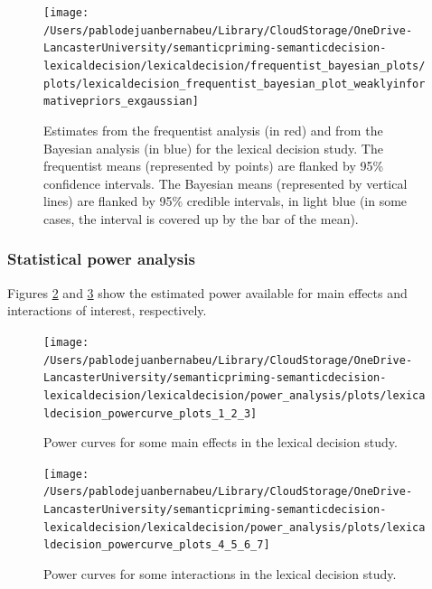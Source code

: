 \documentclass[
  12pt,
  man,floatsintext]{apa7}
\begin{document}
\begin{figure}

{\centering \texttt{[image: /Users/pablodejuanbernabeu/Library/CloudStorage/OneDrive-LancasterUniversity/semanticpriming-semanticdecision-lexicaldecision/lexicaldecision/frequentist\_bayesian\_plots/plots/lexicaldecision\_frequentist\_bayesian\_plot\_weaklyinformativepriors\_exgaussian]} 

}

\caption{Estimates from the frequentist analysis (in red) and from the Bayesian analysis (in blue) for the lexical decision study. The frequentist means (represented by points) are flanked by 95\% confidence intervals. The Bayesian means (represented by vertical lines) are flanked by 95\% credible intervals, in light blue (in some cases, the interval is covered up by the bar of the mean).}\label{fig:lexicaldecision-frequentist-bayesian-plot-weaklyinformativepriors-exgaussian}
\end{figure}

\hypertarget{statistical-power-analysis-2}{%
\subsubsection{Statistical power analysis}\label{statistical-power-analysis-2}}

Figures \ref{fig:lexicaldecision-powercurve-plots-1-2-3} and \ref{fig:lexicaldecision-powercurve-plots-4-5-6-7} show the estimated power available for main effects and interactions of interest, respectively.

\begin{figure}

{\centering \texttt{[image: /Users/pablodejuanbernabeu/Library/CloudStorage/OneDrive-LancasterUniversity/semanticpriming-semanticdecision-lexicaldecision/lexicaldecision/power\_analysis/plots/lexicaldecision\_powercurve\_plots\_1\_2\_3]} 

}

\caption{Power curves for some main effects in the lexical decision study.}\label{fig:lexicaldecision-powercurve-plots-1-2-3}
\end{figure}

\begin{figure}

{\centering \texttt{[image: /Users/pablodejuanbernabeu/Library/CloudStorage/OneDrive-LancasterUniversity/semanticpriming-semanticdecision-lexicaldecision/lexicaldecision/power\_analysis/plots/lexicaldecision\_powercurve\_plots\_4\_5\_6\_7]} 

}

\caption{Power curves for some interactions in the lexical decision study.}\label{fig:lexicaldecision-powercurve-plots-4-5-6-7}
\end{figure}
\end{document}
